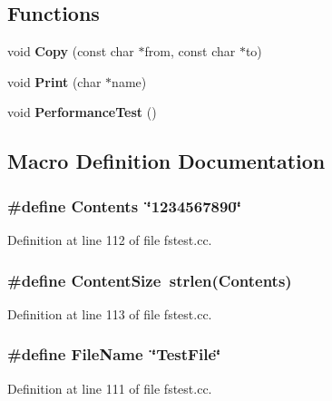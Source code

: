 \subsection*{Functions}
\begin{DoxyCompactItemize}
\item 
void {\bf Copy} (const char $\ast$from, const char $\ast$to)
\item 
void {\bf Print} (char $\ast$name)
\item 
void {\bf Performance\+Test} ()
\end{DoxyCompactItemize}


\subsection{Macro Definition Documentation}
\subsubsection[{Contents}]{\setlength{\rightskip}{0pt plus 5cm}\#define Contents~\char`\"{}1234567890\char`\"{}}\label{fstest_8cc_aad48d06029e55a3cffa0128a50bd7613}


Definition at line 112 of file fstest.\+cc.

\subsubsection[{Content\+Size}]{\setlength{\rightskip}{0pt plus 5cm}\#define Content\+Size~strlen({\bf Contents})}\label{fstest_8cc_a31e2b6a44bcefe764899ae75811105b3}


Definition at line 113 of file fstest.\+cc.

\subsubsection[{File\+Name}]{\setlength{\rightskip}{0pt plus 5cm}\#define File\+Name~\char`\"{}Test\+File\char`\"{}}\label{fstest_8cc_aefc33f4967243b3bd860b293ef93a385}


Definition at line 111 of file fstest.\+cc.

